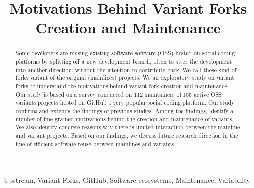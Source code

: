 \documentclass[10pt,conference]{IEEEtran}
\newcommand{\gh}{GitHub\xspace}
\begin{document}
\title{Motivations Behind Variant Forks Creation and Maintenance}

	
\maketitle

\begin{abstract}
Some developers are reusing existing software software (OSS) hosted on social coding platforms by splitting off a new development branch, often to steer the development into another direction, without the intention to  contribute back. We call these kind of forks variant of the original (mainlines) projects.
We an exploratory study on variant forks to understand the motivations behind variant fork creation and maintenance. Our study is based on a survey conducted on 112 maintainers of 105 active OSS
variants projects hosted on \gh a very popular social coding platform.
Our study confirms and extends the findings of previous studies. Among the findings, identify a number of fine-grained motivations behind the creation and maintenance of variants. We also identify concrete reasons why there is limited interaction between the mainline and variant projects. Based on our findings, we discuss future research direction in the line of efficient software reuse between mainlines and variants.
\end{abstract}

\begin{IEEEkeywords}
Upstream, Variant Forks, GitHub, Software ecosystems, Maintenance, Variability
\end{IEEEkeywords}








 

\typeout{}

\end{document}
